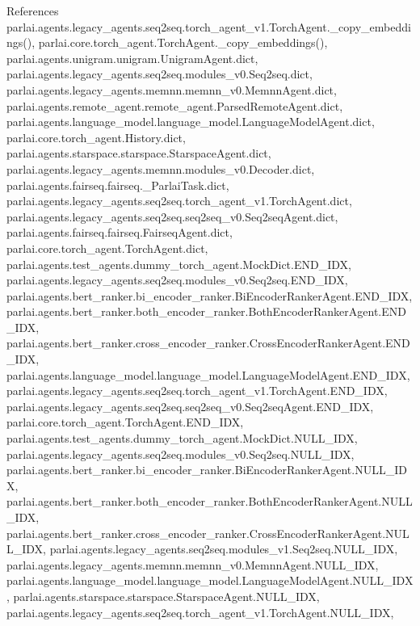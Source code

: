 References parlai.\+agents.\+legacy\+\_\+agents.\+seq2seq.\+torch\+\_\+agent\+\_\+v1.\+Torch\+Agent.\+\_\+copy\+\_\+embeddings(), parlai.\+core.\+torch\+\_\+agent.\+Torch\+Agent.\+\_\+copy\+\_\+embeddings(), parlai.\+agents.\+unigram.\+unigram.\+Unigram\+Agent.\+dict, parlai.\+agents.\+legacy\+\_\+agents.\+seq2seq.\+modules\+\_\+v0.\+Seq2seq.\+dict, parlai.\+agents.\+legacy\+\_\+agents.\+memnn.\+memnn\+\_\+v0.\+Memnn\+Agent.\+dict, parlai.\+agents.\+remote\+\_\+agent.\+remote\+\_\+agent.\+Parsed\+Remote\+Agent.\+dict, parlai.\+agents.\+language\+\_\+model.\+language\+\_\+model.\+Language\+Model\+Agent.\+dict, parlai.\+core.\+torch\+\_\+agent.\+History.\+dict, parlai.\+agents.\+starspace.\+starspace.\+Starspace\+Agent.\+dict, parlai.\+agents.\+legacy\+\_\+agents.\+memnn.\+modules\+\_\+v0.\+Decoder.\+dict, parlai.\+agents.\+fairseq.\+fairseq.\+\_\+\+Parlai\+Task.\+dict, parlai.\+agents.\+legacy\+\_\+agents.\+seq2seq.\+torch\+\_\+agent\+\_\+v1.\+Torch\+Agent.\+dict, parlai.\+agents.\+legacy\+\_\+agents.\+seq2seq.\+seq2seq\+\_\+v0.\+Seq2seq\+Agent.\+dict, parlai.\+agents.\+fairseq.\+fairseq.\+Fairseq\+Agent.\+dict, parlai.\+core.\+torch\+\_\+agent.\+Torch\+Agent.\+dict, parlai.\+agents.\+test\+\_\+agents.\+dummy\+\_\+torch\+\_\+agent.\+Mock\+Dict.\+E\+N\+D\+\_\+\+I\+DX, parlai.\+agents.\+legacy\+\_\+agents.\+seq2seq.\+modules\+\_\+v0.\+Seq2seq.\+E\+N\+D\+\_\+\+I\+DX, parlai.\+agents.\+bert\+\_\+ranker.\+bi\+\_\+encoder\+\_\+ranker.\+Bi\+Encoder\+Ranker\+Agent.\+E\+N\+D\+\_\+\+I\+DX, parlai.\+agents.\+bert\+\_\+ranker.\+both\+\_\+encoder\+\_\+ranker.\+Both\+Encoder\+Ranker\+Agent.\+E\+N\+D\+\_\+\+I\+DX, parlai.\+agents.\+bert\+\_\+ranker.\+cross\+\_\+encoder\+\_\+ranker.\+Cross\+Encoder\+Ranker\+Agent.\+E\+N\+D\+\_\+\+I\+DX, parlai.\+agents.\+language\+\_\+model.\+language\+\_\+model.\+Language\+Model\+Agent.\+E\+N\+D\+\_\+\+I\+DX, parlai.\+agents.\+legacy\+\_\+agents.\+seq2seq.\+torch\+\_\+agent\+\_\+v1.\+Torch\+Agent.\+E\+N\+D\+\_\+\+I\+DX, parlai.\+agents.\+legacy\+\_\+agents.\+seq2seq.\+seq2seq\+\_\+v0.\+Seq2seq\+Agent.\+E\+N\+D\+\_\+\+I\+DX, parlai.\+core.\+torch\+\_\+agent.\+Torch\+Agent.\+E\+N\+D\+\_\+\+I\+DX, parlai.\+agents.\+test\+\_\+agents.\+dummy\+\_\+torch\+\_\+agent.\+Mock\+Dict.\+N\+U\+L\+L\+\_\+\+I\+DX, parlai.\+agents.\+legacy\+\_\+agents.\+seq2seq.\+modules\+\_\+v0.\+Seq2seq.\+N\+U\+L\+L\+\_\+\+I\+DX, parlai.\+agents.\+bert\+\_\+ranker.\+bi\+\_\+encoder\+\_\+ranker.\+Bi\+Encoder\+Ranker\+Agent.\+N\+U\+L\+L\+\_\+\+I\+DX, parlai.\+agents.\+bert\+\_\+ranker.\+both\+\_\+encoder\+\_\+ranker.\+Both\+Encoder\+Ranker\+Agent.\+N\+U\+L\+L\+\_\+\+I\+DX, parlai.\+agents.\+bert\+\_\+ranker.\+cross\+\_\+encoder\+\_\+ranker.\+Cross\+Encoder\+Ranker\+Agent.\+N\+U\+L\+L\+\_\+\+I\+DX, parlai.\+agents.\+legacy\+\_\+agents.\+seq2seq.\+modules\+\_\+v1.\+Seq2seq.\+N\+U\+L\+L\+\_\+\+I\+DX, parlai.\+agents.\+legacy\+\_\+agents.\+memnn.\+memnn\+\_\+v0.\+Memnn\+Agent.\+N\+U\+L\+L\+\_\+\+I\+DX, parlai.\+agents.\+language\+\_\+model.\+language\+\_\+model.\+Language\+Model\+Agent.\+N\+U\+L\+L\+\_\+\+I\+DX, parlai.\+agents.\+starspace.\+starspace.\+Starspace\+Agent.\+N\+U\+L\+L\+\_\+\+I\+DX, parlai.\+agents.\+legacy\+\_\+agents.\+seq2seq.\+torch\+\_\+agent\+\_\+v1.\+Torch\+Agent.\+N\+U\+L\+L\+\_\+\+I\+DX, 